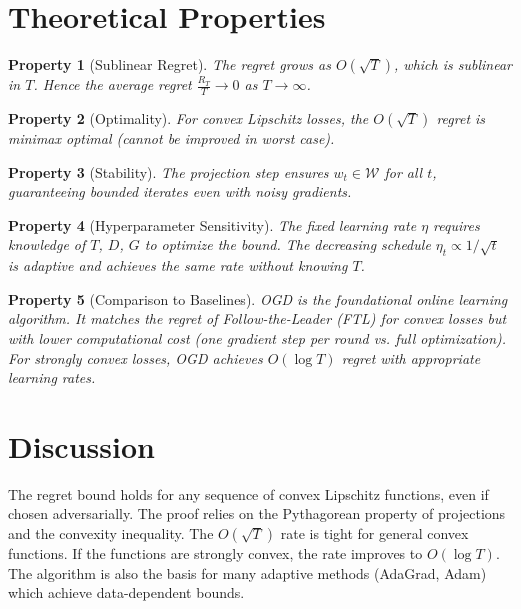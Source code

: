 \documentclass{article}
\newtheorem{property}{Property}
\begin{document}
\section*{Theoretical Properties}
\begin{property}[Sublinear Regret]
The regret grows as $O(\sqrt{T})$, which is sublinear in $T$. Hence the average regret $\frac{R_T}{T} \to 0$ as $T \to \infty$.
\end{property}

\begin{property}[Optimality]
For convex Lipschitz losses, the $O(\sqrt{T})$ regret is minimax optimal (cannot be improved in worst case).
\end{property}

\begin{property}[Stability]
The projection step ensures $w_t \in \mathcal{W}$ for all $t$, guaranteeing bounded iterates even with noisy gradients.
\end{property}

\begin{property}[Hyperparameter Sensitivity]
The fixed learning rate $\eta$ requires knowledge of $T$, $D$, $G$ to optimize the bound. The decreasing schedule $\eta_t \propto 1/\sqrt{t}$ is adaptive and achieves the same rate without knowing $T$.
\end{property}

\begin{property}[Comparison to Baselines]
OGD is the foundational online learning algorithm. It matches the regret of Follow-the-Leader (FTL) for convex losses but with lower computational cost (one gradient step per round vs. full optimization). For strongly convex losses, OGD achieves $O(\log T)$ regret with appropriate learning rates.
\end{property}

\section*{Discussion}
The regret bound holds for any sequence of convex Lipschitz functions, even if chosen adversarially. The proof relies on the Pythagorean property of projections and the convexity inequality. The $O(\sqrt{T})$ rate is tight for general convex functions. If the functions are strongly convex, the rate improves to $O(\log T)$. The algorithm is also the basis for many adaptive methods (AdaGrad, Adam) which achieve data-dependent bounds.

\end{document}
